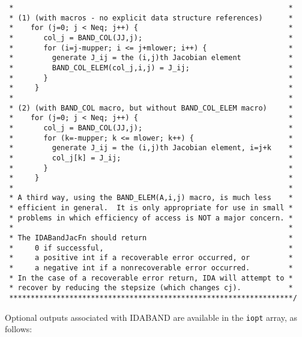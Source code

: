 \documentclass[11pt]{article}
\begin{document}
\begin{verbatim}
 *                                                                *
 * (1) (with macros - no explicit data structure references)      *
 *    for (j=0; j < Neq; j++) {                                   *
 *       col_j = BAND_COL(JJ,j);                                  *
 *       for (i=j-mupper; i <= j+mlower; i++) {                   *
 *         generate J_ij = the (i,j)th Jacobian element           *
 *         BAND_COL_ELEM(col_j,i,j) = J_ij;                       *
 *       }                                                        *
 *     }                                                          *
 *                                                                *
 * (2) (with BAND_COL macro, but without BAND_COL_ELEM macro)     *
 *    for (j=0; j < Neq; j++) {                                   *
 *       col_j = BAND_COL(JJ,j);                                  *
 *       for (k=-mupper; k <= mlower; k++) {                      *
 *         generate J_ij = the (i,j)th Jacobian element, i=j+k    *
 *         col_j[k] = J_ij;                                       *
 *       }                                                        *
 *     }                                                          *
 *                                                                *
 * A third way, using the BAND_ELEM(A,i,j) macro, is much less    *
 * efficient in general.  It is only appropriate for use in small *
 * problems in which efficiency of access is NOT a major concern. *
 *                                                                *
 * The IDABandJacFn should return                                 *
 *     0 if successful,                                           *
 *     a positive int if a recoverable error occurred, or         *
 *     a negative int if a nonrecoverable error occurred.         *
 * In the case of a recoverable error return, IDA will attempt to *
 * recover by reducing the stepsize (which changes cj).           *
 ******************************************************************/

\end{verbatim}
\normalsize

Optional outputs associated with IDABAND are available in the 
{\tt iopt} array, as follows:
\end{document}
